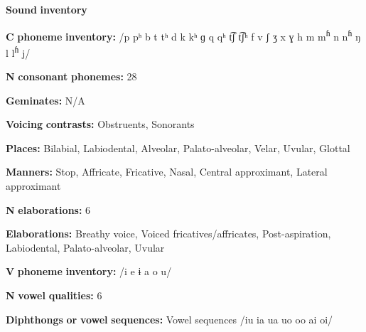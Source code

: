 \documentclass[output=paper]{langsci/langscibook}
\begin{document}
\begin{styleBody}
\textbf{Sound} \textbf{inventory}
\end{styleBody}

\begin{styleBody}
\textbf{C} \textbf{phoneme} \textbf{inventory:} /p pʰ b t tʰ d k kʰ ɡ q qʰ t͡ʃ t͡ʃʰ f v ʃ ʒ x ɣ h m m\textsuperscript{ɦ} n n\textsuperscript{ɦ} ŋ l l\textsuperscript{ɦ} j/
\end{styleBody}

\begin{styleBody}
\textbf{N} \textbf{consonant} \textbf{phonemes:} 28
\end{styleBody}

\begin{styleBody}
\textbf{Geminates:} N/A
\end{styleBody}

\begin{styleBody}
\textbf{Voicing} \textbf{contrasts:} Obstruents, Sonorants
\end{styleBody}

\begin{styleBody}
\textbf{Places:} Bilabial, Labiodental, Alveolar, Palato-alveolar, Velar, Uvular, Glottal
\end{styleBody}

\begin{styleBody}
\textbf{Manners:} Stop, Affricate, Fricative, Nasal, Central approximant, Lateral approximant
\end{styleBody}

\begin{styleBody}
\textbf{N} \textbf{elaborations:} 6
\end{styleBody}

\begin{styleBody}
\textbf{Elaborations:} Breathy voice, Voiced fricatives/affricates, Post-aspiration, Labiodental, Palato-alveolar, Uvular
\end{styleBody}

\begin{styleBody}
\textbf{V} \textbf{phoneme} \textbf{inventory:} /i e ɨ a o u/
\end{styleBody}

\begin{styleBody}
\textbf{N} \textbf{vowel} \textbf{qualities:} 6
\end{styleBody}

\begin{styleBody}
\textbf{Diphthongs} \textbf{or} \textbf{vowel} \textbf{sequences:} Vowel sequences /iu ia ua uo oo ai oi/
\end{styleBody}
\end{document}
